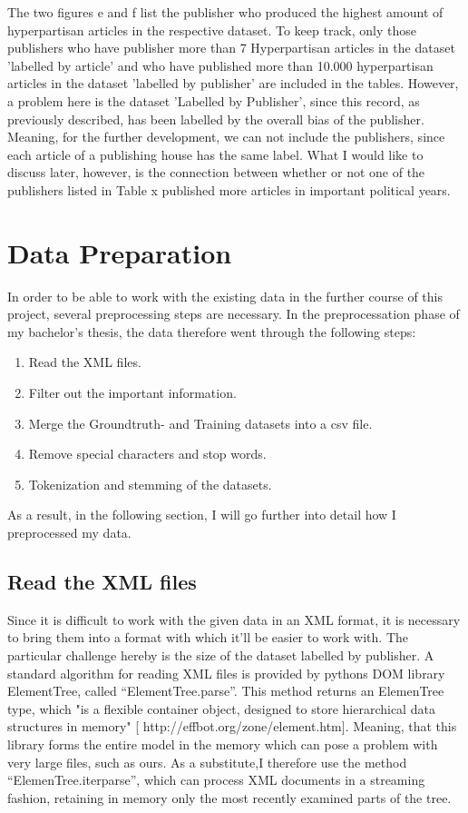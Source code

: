 \documentclass[11pt,titlepage,oneside,openany]{book}
\begin{document}
\noindent The two figures e and f list the publisher who produced the highest amount of hyperpartisan articles in the respective dataset. To keep track, only those publishers who have publisher more than 7 Hyperpartisan articles in the dataset 'labelled by article' and who have published more than 10.000 hyperpartisan articles in the dataset 'labelled by publisher' are included in the tables. However, a problem here is the dataset 'Labelled by Publisher', since this record, as previously described, has been labelled by the overall bias of the publisher. Meaning, for the further development, we can not include the publishers, since each article of a publishing house has the same label. What I would like to discuss later, however, is the connection between whether or not one of the publishers listed in Table x published more articles in important political years.


\section{Data Preparation}
In order to be able to work with the existing data in the further course of this project, several preprocessing steps are necessary. In the preprocessation phase of my bachelor's thesis, the data therefore went through the following steps:
\begin{enumerate}
	\item Read the XML files. 
	\item Filter out the important information.
	\item Merge the Groundtruth- and Training datasets into a csv file.
	\item Remove special characters and stop words.
	\item Tokenization and stemming of the datasets.
\end{enumerate}	
\noindent As a result, in the following section, I will go further into detail how I preprocessed my data.


\subsection{Read the XML files}
Since it is difficult to work with the given data in an XML format, it is necessary to bring them into a format with which it’ll be easier to work with. The particular challenge hereby is the size of the dataset labelled by publisher. A standard algorithm for reading XML files is provided by pythons DOM library ElementTree, called “ElementTree.parse”. This method returns an ElemenTree type, which "is a flexible container object, designed to store hierarchical data structures in memory" [ http://effbot.org/zone/element.htm]. Meaning, that this library forms the entire model in the memory which can pose a problem with very large files, such as ours. As a substitute,I therefore use the method “ElemenTree.iterparse”, which can process XML documents in a streaming fashion, retaining in memory only the most recently examined parts of the tree. 
\end{document}
